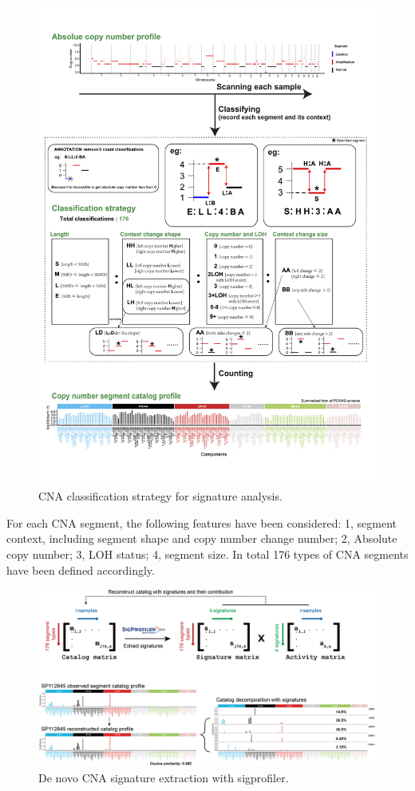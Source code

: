\documentclass[
]{article}
\begin{document}
\begin{figure}

{\centering \includegraphics[width=0.8\linewidth]{Figures/copy number classification} 

}

\caption{CNA classification strategy for signature analysis.}\label{fig:figure1}
\end{figure}

For each CNA segment, the following features have been considered: 1,
segment context, including segment shape and copy number change number;
2, Absolute copy number; 3, LOH status; 4, segment size. In total 176
types of CNA segments have been defined accordingly.

\begin{figure}

{\centering \includegraphics[width=0.8\linewidth]{Figures/extraction} 

}

\caption{De novo CNA signature extraction with sigprofiler.}\label{fig:figure2}
\end{figure}
\end{document}
